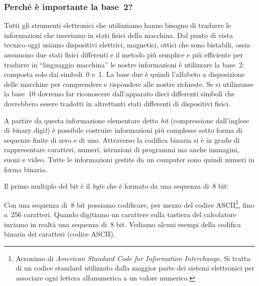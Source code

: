 \ovalbox{\risolvii \ref{ese:4.18}, \ref{ese:4.19}}

\subsubsection{Perché è importante la base~2?}

Tutti gli strumenti elettronici che utilizziamo hanno bisogno di
tradurre le informazioni che inseriamo in stati fisici della
macchina. Dal punto di vista tecnico oggi usiamo dispositivi elettrici, magnetici, ottici che sono bistabili, ossia assumono due stati fisici differenti e il metodo più semplice e più efficiente per tradurre in ``linguaggio macchina''
le nostre informazioni è utilizzare la base~2: composta solo dai
simboli~0 e~1. La base due è quindi l'alfabeto a
disposizione delle macchine per comprendere e rispondere alle nostre
richieste. Se si utilizzasse la base~10 dovremo far riconoscere
dall'apparato dieci differenti simboli che dovrebbero
essere tradotti in altrettanti stati differenti di dispositivi fisici.

A partire da questa informazione elementare detta \textit{bit}
(compressione dall'inglese di \textit{bi}nary
digi\textit{t}) è possibile costruire informazioni più complesse
sotto forma di sequenze finite di zero e di uno. Attraverso la codifica
binaria si è in grado di rappresentare caratteri, numeri, istruzioni
di programmi ma anche immagini, suoni e video. Tutte le informazioni
gestite da un computer sono quindi numeri in forma binaria.

Il primo multiplo del bit è il \textit{byte} che è formato da una
sequenza di~8 bit:
 \begin{center}

 \end{center}

Con una sequenza di~8 bit possiamo codificare, per mezzo del codice ASCII\footnote{Acronimo di \textit{American Standard Code for Information Interchange}. Si tratta di un codice standard utilizzato dalla maggior parte dei sistemi elettronici per associare ogni lettera alfanumerica a un valore numerico.}, fino a~256 caratteri. Quando digitiamo un carattere sulla
tastiera del calcolatore inviamo in realtà una sequenza di~8 bit.
Vediamo alcuni esempi della codifica binaria dei caratteri (codice ASCII).

